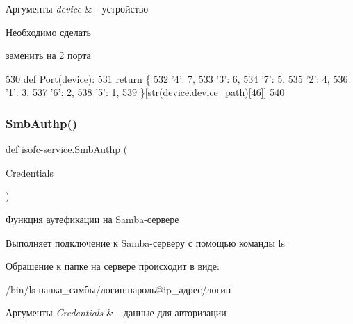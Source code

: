 \begin{DoxyParams}{Аргументы}
{\em device} & -\/ устройство \\
\hline
\end{DoxyParams}
\begin{DoxyRefDesc}{Необходимо сделать}
\item[\mbox{\hyperlink{todo__todo000001}{Необходимо сделать}}]заменить на 2 порта \end{DoxyRefDesc}

\begin{DoxyCode}
530 \textcolor{keyword}{def }Port(device):
531     \textcolor{keywordflow}{return} \{
532         \textcolor{stringliteral}{'4'}: 7,
533         \textcolor{stringliteral}{'3'}: 6,
534         \textcolor{stringliteral}{'7'}: 5,
535         \textcolor{stringliteral}{'2'}: 4,
536         \textcolor{stringliteral}{'1'}: 3,
537         \textcolor{stringliteral}{'6'}: 2,
538         \textcolor{stringliteral}{'5'}: 1,
539     \}[str(device.device\_path)[46]]
540 
\end{DoxyCode}
\mbox{\label{isofc-service_8py_file_af127619d58278714c207c58f6d85d52b}} 
\subsubsection{\texorpdfstring{Smb\+Authp()}{SmbAuthp()}}
{\footnotesize\ttfamily def isofc-\/service.\+Smb\+Authp (\begin{DoxyParamCaption}\item[{}]{Credentials }\end{DoxyParamCaption})}



Функция аутефикации на Samba-\/сервере 

Выполняет подключение к Samba-\/серверу с помощью команды ls

Обрашение к папке на сервере происходит в виде\+:


\begin{DoxyCode}
/bin/ls папка\_самбы/логин:пароль@ip\_адрес/логин
\end{DoxyCode}
 
\begin{DoxyParams}{Аргументы}
{\em Credentials} & -\/ данные для авторизации \\
\hline
\end{DoxyParams}

